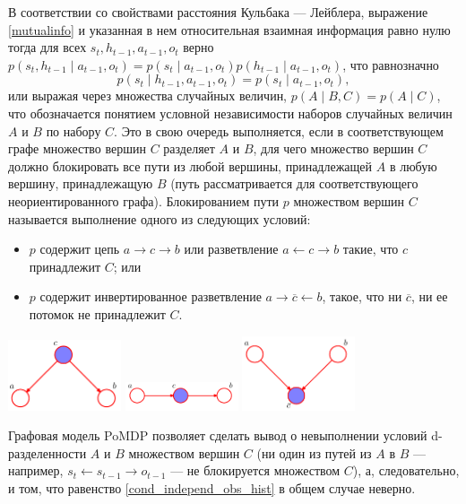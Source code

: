 \documentclass[../main.tex]{subfiles}
\begin{document}
В соответствии со свойствами расстояния Кульбака — Лейблера, выражение \ref{mutualinfo}  и указанная в нем относительная взаимная информация равно нулю  тогда для всех $s_t, h_{t-1}, a_{t-1}, o_t$ верно $p(s_t, h_{t-1} \mid  a_{t-1}, o_t) = p(s_t \mid  a_{t-1}, o_t)p( h_{t-1} \mid  a_{t-1}, o_t)$, что равнозначно
\begin{equation}
\label{cond_independ_obs_hist}  p(s_t \mid h_{t-1}, a_{t-1}, o_t ) = p(s_t \mid a_{t-1}, o_t  ), 
\end{equation}
или выражая через множества случайных величин, $ p(A \mid B,C) = p(A \mid C)  $, что обозначается понятием условной независимости наборов случайных величин $A$ и $B$ по набору $C$.
Это в свою очередь выполняется, если в соответствующем графе множество вершин $C$ разделяет $A$ и $B$, для чего множество вершин $C$ должно блокировать все пути из любой вершины, принадлежащей $A$ в любую вершину, принадлежащую $B$ (путь рассматривается для соответствующего неориентированного графа). Блокированием пути $p$ множеством вершин $C$ называется выполнение одного из следующих условий:
\begin{itemize}
	\item  $p$  содержит цепь ${\displaystyle a\to c\to b}$  или разветвление  ${\displaystyle a\gets c\to b}$ такие, что $c$ принадлежит  $C$; или
	\item $p$  содержит инвертированное разветвление   ${\displaystyle a\to \overline c\gets b}$, такое, что ни $\overline c$, ни ее потомок не принадлежит  $C$.
\end{itemize}
\includegraphics[width=0.25\textwidth]{Images/dsepar1.png}
\includegraphics[width=0.25\textwidth]{Images/dsepar2.png}
\includegraphics[width=0.25\textwidth]{Images/dsepar3.png}

Графовая модель PoMDP позволяет сделать вывод о невыполнении условий d-разделенности  $A$ и $B$ множеством вершин $C$ (ни один из путей из $A$ в $B$ --- например, $s_t \gets s_{t-1 } \to o_{t-1}$ --- не блокируется множеством $C$), а, следовательно, и том, что равенство \eqref{cond_independ_obs_hist} в общем случае неверно.
\end{document}
